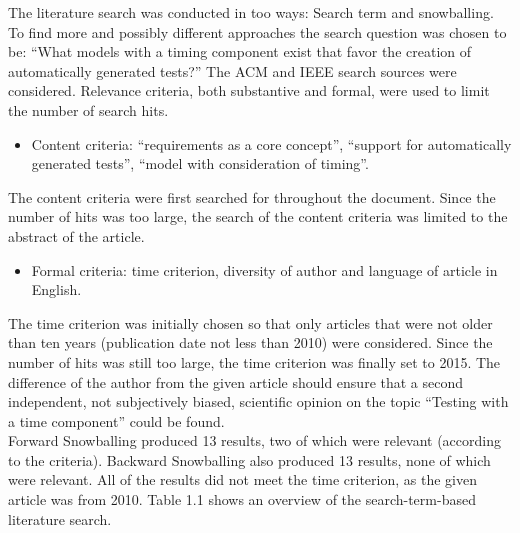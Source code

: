 The literature search was conducted in too ways: Search term and snowballing.
To find more and possibly different approaches the search question
was chosen to be: \enquote{What models with a timing component
exist that favor the creation of automatically generated tests?}
The ACM \cite*{acm} and IEEE \cite*{ieee} search sources were considered.
Relevance criteria, both substantive and formal, were used to limit
the number of search hits. 
\begin{itemize}
\item Content criteria: \enquote{requirements as a core concept},
\enquote{support for automatically generated tests},
\enquote{model with consideration of timing}. 
\end{itemize}
The content criteria were first searched for throughout the document.
Since the number of hits was too large, the search of the content
criteria was limited to the abstract of the article. 
\begin{itemize}
\item Formal criteria: time criterion, diversity of author and language
of article in English. 
\end{itemize}
The time criterion was initially chosen so that only articles that
were not older than ten years (publication date not less than 2010)
were considered. Since the number of hits was still too large, the
time criterion was finally set to 2015. The difference of the author
from the given article should ensure that a second independent, not
subjectively biased, scientific opinion on the topic \enquote{Testing
with a time component} could be found.\\
Forward Snowballing produced 13 results, two of which were relevant
(according to the criteria). Backward Snowballing also produced 13
results, none of which were relevant. All of the results did not meet
the time criterion, as the given article was from 2010. Table 1.1
shows an overview of the search-term-based literature search.\\
 
